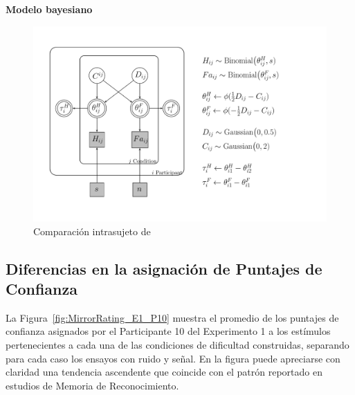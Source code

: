 \textbf{Modelo bayesiano}


\begin{figure}[th]
\centering
\includegraphics[width=1.1\textwidth]{Figures/Model_Tau_Diff_Tetas}
\caption[Modelo Tau: Modelo Bayesiano para evaluar las diferencias entre las tasas de hits y falsas alarmas]{Comparación intrasujeto de}
\label{fig:Mod_Tau}
\end{figure}














\subsection{Diferencias en la asignación de Puntajes de Confianza}


La Figura~\ref{fig:MirrorRating_E1_P10} muestra el promedio de los puntajes de confianza asignados por el Participante 10 del Experimento 1 a los estímulos pertenecientes a cada una de las condiciones de dificultad construidas, separando para cada caso los ensayos con ruido y señal. En la figura puede apreciarse con claridad una tendencia ascendente que coincide con el patrón reportado en estudios de Memoria de Reconocimiento.\\

